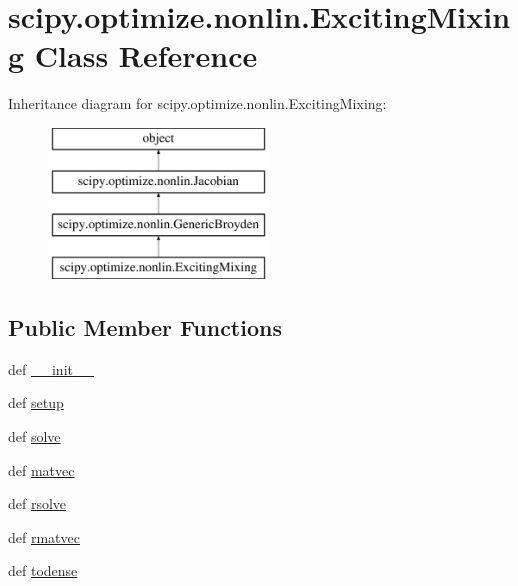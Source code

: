 \hypertarget{classscipy_1_1optimize_1_1nonlin_1_1ExcitingMixing}{}\section{scipy.\+optimize.\+nonlin.\+Exciting\+Mixing Class Reference}
\label{classscipy_1_1optimize_1_1nonlin_1_1ExcitingMixing}
Inheritance diagram for scipy.\+optimize.\+nonlin.\+Exciting\+Mixing\+:\begin{figure}[H]
\begin{center}
\leavevmode
\includegraphics[height=4.000000cm]{classscipy_1_1optimize_1_1nonlin_1_1ExcitingMixing}
\end{center}
\end{figure}
\subsection*{Public Member Functions}
\begin{DoxyCompactItemize}
\item 
def \hyperlink{classscipy_1_1optimize_1_1nonlin_1_1ExcitingMixing_af14ac35ef6e1a5e4123a5525f67baacd}{\+\_\+\+\_\+init\+\_\+\+\_\+}
\item 
def \hyperlink{classscipy_1_1optimize_1_1nonlin_1_1ExcitingMixing_a8ca8496e4ae228cf460a00b5869c81ae}{setup}
\item 
def \hyperlink{classscipy_1_1optimize_1_1nonlin_1_1ExcitingMixing_a3123a4bf40d5e3afc162f2e4e29b1318}{solve}
\item 
def \hyperlink{classscipy_1_1optimize_1_1nonlin_1_1ExcitingMixing_aef117f1130a094b69f3904f60e929058}{matvec}
\item 
def \hyperlink{classscipy_1_1optimize_1_1nonlin_1_1ExcitingMixing_a84eaa066fa43522ac1ea969fe5a1d75a}{rsolve}
\item 
def \hyperlink{classscipy_1_1optimize_1_1nonlin_1_1ExcitingMixing_aebbc437488943710e938d3801cb9a0ed}{rmatvec}
\item 
def \hyperlink{classscipy_1_1optimize_1_1nonlin_1_1ExcitingMixing_a63c051e56e67003f4fe680a85d9817db}{todense}
\end{DoxyCompactItemize}
